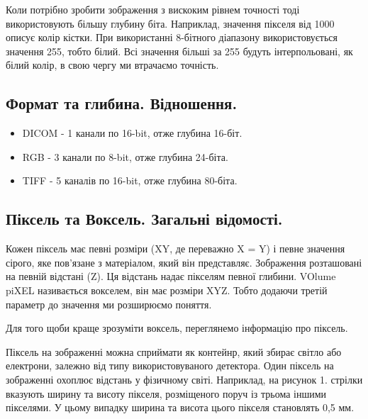 \documentclass[11pt]{article}
\begin{document}
    Коли потрібно зробити зображення з вискоким рівнем точності тоді використовують більшу глубину біта.
    Наприклад, значення пікселя від 1000 описує колір кістки.
    При використанні 8-бітного діапазону використовується значення 255, тобто білий.
    Всі значення більші за 255 будуть інтерпольовані, як білий колір, в свою чергу ми втрачаємо точність.

    \subsection{Формат та глибина. Відношення.}\label{subsec:formats}
    \begin{itemize}
        \item DICOM - 1 канали по 16-bit, отже глубина 16-біт.
        \item RGB - 3 канали по 8-bit, отже глубина 24-біта.
        \item TIFF - 5 каналів по 16-bit, отже глубина 80-біта.
    \end{itemize}

    \subsection{Піксель та Воксель. Загальні відомості.}\label{subsec:pixel_voxel}
    Кожен піксель має певні розміри (XY, де переважно X = Y) і певне значення сірого, яке пов’язане з матеріалом, який він представляє.
    Зображення розташовані на певній відстані (Z).
    Ця відстань надає пікселям певної глибини.
    VOlume piXEL називається вокселем, він має розміри XYZ.
    Тобто додаючи третій параметр до значення ми розширюємо поняття.

    Для того щоби краще зрозуміти воксель, переглянемо інформацію про піксель.

    Піксель на зображенні можна сприймати як контейнр, який збирає світло або електрони, залежно від типу використовуваного детектора.
    Один піксель на зображенні охоплює відстань у фізичному світі.
    Наприклад, на рисунок 1. стрілки вказують ширину та висоту пікселя, розміщеного поруч із трьома іншими пікселями.
    У цьому випадку ширина та висота цього пікселя становлять 0,5 мм.
\end{document}
